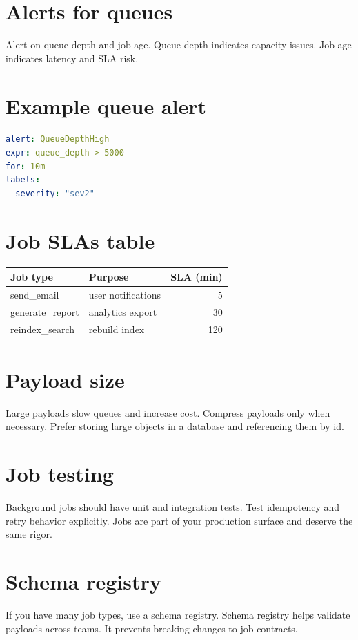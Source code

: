 \section{Alerts for queues}
Alert on queue depth and job age.
Queue depth indicates capacity issues.
Job age indicates latency and SLA risk.

\section{Example queue alert}
\begin{lstlisting}[language=YAML]
alert: QueueDepthHigh
expr: queue_depth > 5000
for: 10m
labels:
  severity: "sev2"
\end{lstlisting}

\section{Job SLAs table}
\begin{tabularx}{\textwidth}{@{}lXr@{}}
\toprule
Job type & Purpose & SLA (min) \\
\midrule
send\_email & user notifications & 5 \\
generate\_report & analytics export & 30 \\
reindex\_search & rebuild index & 120 \\
\bottomrule
\end{tabularx}

\section{Payload size}
Large payloads slow queues and increase cost.
Compress payloads only when necessary.
Prefer storing large objects in a database and referencing them by id.

\section{Job testing}
Background jobs should have unit and integration tests.
Test idempotency and retry behavior explicitly.
Jobs are part of your production surface and deserve the same rigor.

\section{Schema registry}
If you have many job types, use a schema registry.
Schema registry helps validate payloads across teams.
It prevents breaking changes to job contracts.

